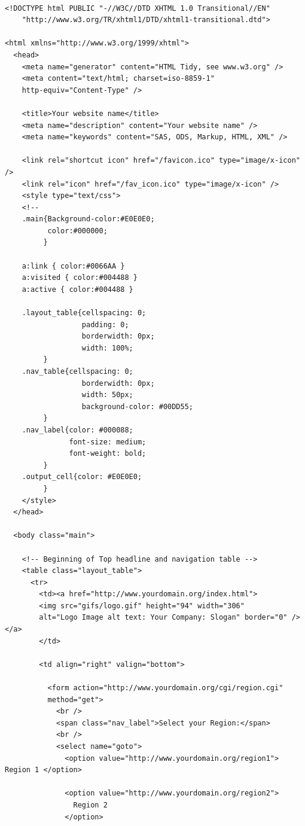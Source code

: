 \begin{Verbatim}[frame=lines, framesep=3mm, label={Sample}]

<!DOCTYPE html PUBLIC "-//W3C//DTD XHTML 1.0 Transitional//EN"
    "http://www.w3.org/TR/xhtml1/DTD/xhtml1-transitional.dtd">

<html xmlns="http://www.w3.org/1999/xhtml">
  <head>
    <meta name="generator" content="HTML Tidy, see www.w3.org" />
    <meta content="text/html; charset=iso-8859-1"
    http-equiv="Content-Type" />

    <title>Your website name</title>
    <meta name="description" content="Your website name" />
    <meta name="keywords" content="SAS, ODS, Markup, HTML, XML" />

    <link rel="shortcut icon" href="/favicon.ico" type="image/x-icon" />
    <link rel="icon" href="/fav_icon.ico" type="image/x-icon" />
    <style type="text/css">
    <!--
    .main{Background-color:#E0E0E0;
          color:#000000;
         }

    a:link { color:#0066AA }
    a:visited { color:#004488 }
    a:active { color:#004488 }

    .layout_table{cellspacing: 0;
                  padding: 0;
                  borderwidth: 0px;
                  width: 100%;
         }
    .nav_table{cellspacing: 0;
                  borderwidth: 0px;
                  width: 50px;
                  background-color: #00DD55;
         }
    .nav_label{color: #000088;
               font-size: medium;
               font-weight: bold;
         }
    .output_cell{color: #E0E0E0;
         }
    </style>
  </head>

  <body class="main">

    <!-- Beginning of Top headline and navigation table -->
    <table class="layout_table">
      <tr>
        <td><a href="http://www.yourdomain.org/index.html">
        <img src="gifs/logo.gif" height="94" width="306"
        alt="Logo Image alt text: Your Company: Slogan" border="0" /></a>
        </td>

        <td align="right" valign="bottom">

          <form action="http://www.yourdomain.org/cgi/region.cgi"
          method="get">
            <br />
            <span class="nav_label">Select your Region:</span>
            <br />
            <select name="goto">
              <option value="http://www.yourdomain.org/region1"> Region 1 </option>

              <option value="http://www.yourdomain.org/region2">
                Region 2
              </option>


\end{Verbatim}
